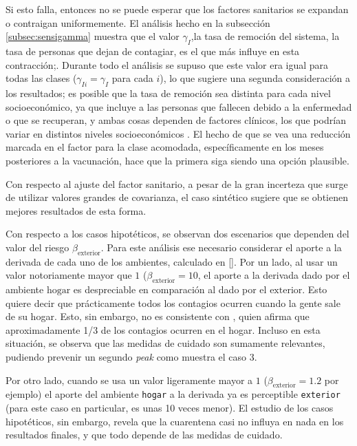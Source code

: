 Si esto falla, entonces no se puede esperar que los factores sanitarios se expandan o contraigan uniformemente. El análisis hecho en la subsección \ref{subsec:sensigamma} muestra que el valor \(\gamma_I\),la tasa de remoción del sistema, la tasa de personas que dejan de contagiar, es el que más influye en esta contracción;. Durante todo el análisis se supuso que este valor era igual para todas las clases (\(\gamma_{Ii} = \gamma_I\) para cada \(i\)), lo que sugiere una segunda consideración a los resultados; es posible que la tasa de remoción sea distinta para cada nivel socioeconómico, ya que incluye a las personas que fallecen debido a la enfermedad o que se recuperan, y ambas cosas dependen de factores clínicos, los que podrían variar en distintos niveles socioeconómicos \cite{Mena2021}. El hecho de que se vea una reducción marcada en el factor para la clase acomodada, específicamente en los meses posteriores a la vacunación, hace que la primera siga siendo una opción plausible.

Con respecto al ajuste del factor sanitario, a pesar de la gran incerteza que surge de utilizar valores grandes de covarianza, el caso sintético sugiere que se obtienen mejores resultados de esta forma.

Con respecto a los casos hipotéticos, se observan dos escenarios que dependen del valor del riesgo \(\beta_{\text{exterior}}\). Para este análisis ese necesario considerar el aporte a la derivada de cada uno de los ambientes, calculado en \ref{}. 
Por un lado, al usar un valor notoriamente mayor que \(1\) (\(\beta_{\text{exterior}} = 10\), el aporte a la derivada dado por el ambiente \(\text{hogar}\) es despreciable en comparación al dado por el \(\text{exterior}\). Esto quiere decir que prácticamente todos los contagios ocurren cuando la gente sale de su hogar. Esto, sin embargo, no es consistente con \cite{Ferguson2020}, quien afirma que aproximadamente 1/3 de los contagios ocurren en el hogar. Incluso en esta situación, se observa que las medidas de cuidado son sumamente relevantes, pudiendo prevenir un segundo \textit{peak} como muestra el caso 3.

Por otro lado, cuando se usa un valor ligeramente mayor a \(1\) (\(\beta_{\text{exterior}} = 1.2\) por ejemplo) el aporte del ambiente \texttt{hogar} a la derivada ya es perceptible \texttt{exterior} (para este caso en particular, es unas 10 veces menor). El estudio de los casos hipotéticos, sin embargo, revela que la cuarentena casi no influya en nada en los resultados finales, y que todo depende de las medidas de cuidado.


